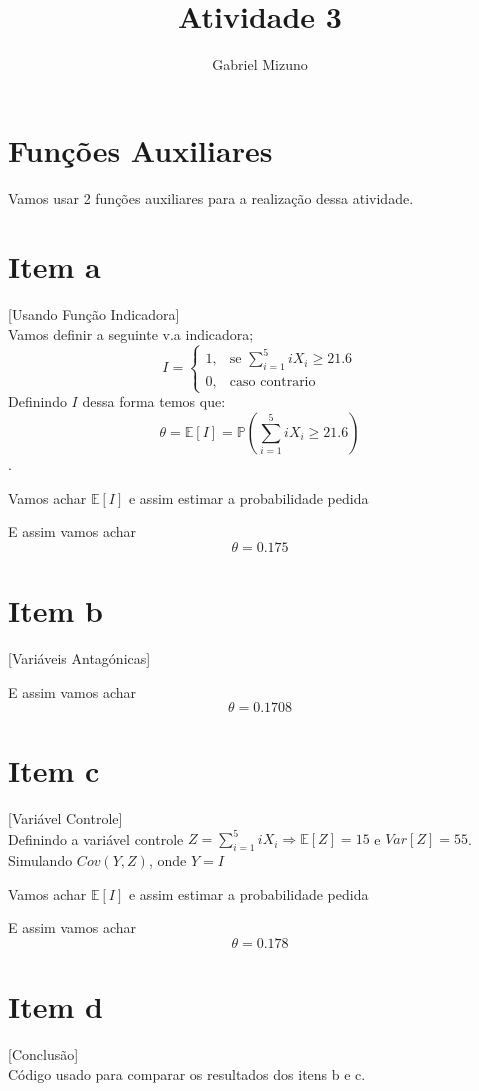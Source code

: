 \documentclass[11pt,a4paper]{article}
\title{Atividade 3}
\author{Gabriel Mizuno}
\begin{document}
\maketitle

\section*{Funções Auxiliares}
Vamos usar 2 funções auxiliares para a realização dessa atividade.


\section{Item a}[Usando Função Indicadora] \\
Vamos definir a seguinte v.a indicadora;$$I=\begin{cases} 1, & \mbox{se } \displaystyle\sum_{i=1}^5 iX_{i}\geqslant21.6\\ 0, & \mbox{caso contrario}\end{cases}$$  
Definindo $I$ dessa forma temos que:
$$\theta=\mathbb{E}[I]=\mathbb{P}\left( \displaystyle\sum_{i=1}^5 iX_{i}\geqslant21.6\right) $$.
\newpage


Vamos achar $\mathbb{E}[I]$ e assim estimar a probabilidade pedida


E assim vamos achar $$\theta=0.175 $$
\section{Item b}[Variáveis Antagónicas]

E assim vamos achar $$\theta=0.1708 $$
\newpage
\section{Item c}[Variável Controle]\\
Definindo a variável controle $Z=\displaystyle\sum_{i=1}^5 iX_{i} \Rightarrow \mathbb{E}[Z]=15$ e $Var[Z]=55$.
Simulando $Cov(Y,Z)$, onde $Y=I$



Vamos achar $\mathbb{E}[I]$ e assim estimar a probabilidade pedida


E assim vamos achar $$\theta=0.178 $$
\section{Item d}[Conclusão]\\
Código usado para comparar os resultados dos itens b e c.

\end{document}
